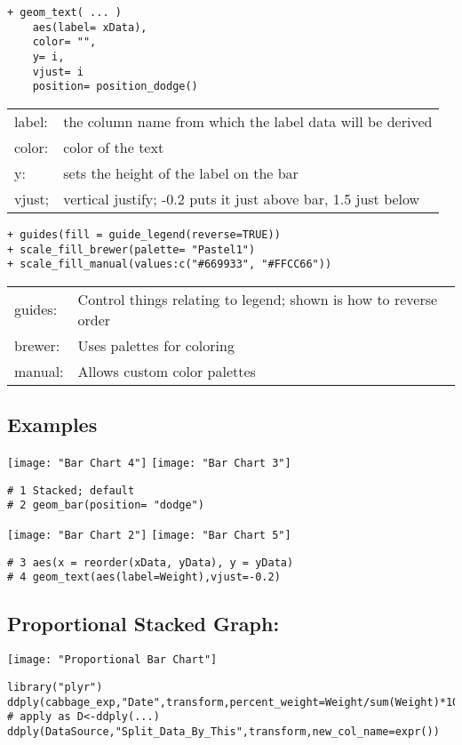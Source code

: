 \documentclass[]{article}
\begin{document}
\begin{verbatim}
+ geom_text( ... ) 
	aes(label= xData),
	color= "",
	y= i,
	vjust= i
	position= position_dodge()
\end{verbatim}
\begin{tabular}{l l}
	label: & the column name from which the label data will be derived \\
	color: & color of the text \\
	y: & sets the height of the label on the bar \\
	vjust; & vertical justify; -0.2 puts it just above bar, 1.5 just below \\
\end{tabular}

\begin{verbatim}
+ guides(fill = guide_legend(reverse=TRUE))
+ scale_fill_brewer(palette= "Pastel1")
+ scale_fill_manual(values:c("#669933", "#FFCC66"))
\end{verbatim}
\begin{tabular}{l l}
	guides: & Control things relating to legend; shown is how to reverse order \\
	brewer: & Uses palettes for coloring \\
	manual:	& Allows custom color palettes \\
\end{tabular}

\subsection{Examples}

\texttt{[image: "Bar Chart 4"]}
\texttt{[image: "Bar Chart 3"]}
\begin{verbatim}
# 1 Stacked; default
# 2 geom_bar(position= "dodge")
\end{verbatim}
\texttt{[image: "Bar Chart 2"]}
\texttt{[image: "Bar Chart 5"]}
\begin{verbatim}
# 3 aes(x = reorder(xData, yData), y = yData)
# 4 geom_text(aes(label=Weight),vjust=-0.2)
\end{verbatim}

\subsection{Proportional Stacked Graph:}
\texttt{[image: "Proportional Bar Chart"]}
\begin{verbatim}
library("plyr")
ddply(cabbage_exp,"Date",transform,percent_weight=Weight/sum(Weight)*100)
# apply as D<-ddply(...)
ddply(DataSource,"Split_Data_By_This",transform,new_col_name=expr())
\end{verbatim}
\end{document}
